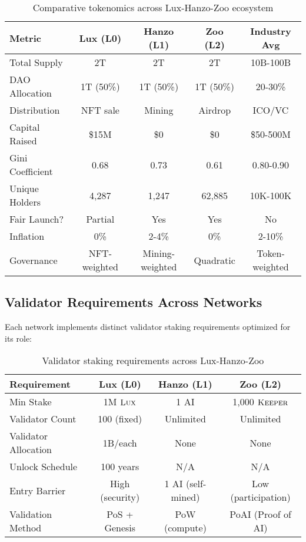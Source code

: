 \documentclass[11pt,letterpaper]{article}
\theoremstyle{definition}
\theoremstyle{remark}
\newcommand{\KEEPER}{\textsc{Keeper}}
\newcommand{\Lux}{\textsc{Lux}}
\begin{document}
\begin{table}[h]
\centering
\small
\begin{tabular}{lcccc}
\toprule
\textbf{Metric} & \textbf{Lux (L0)} & \textbf{Hanzo (L1)} & \textbf{Zoo (L2)} & \textbf{Industry Avg} \\
\midrule
Total Supply & 2T & 2T & 2T & 10B-100B \\
DAO Allocation & 1T (50\%) & 1T (50\%) & 1T (50\%) & 20-30\% \\
Distribution & NFT sale & Mining & Airdrop & ICO/VC \\
Capital Raised & \$15M & \$0 & \$0 & \$50-500M \\
Gini Coefficient & 0.68 & 0.73 & 0.61 & 0.80-0.90 \\
Unique Holders & 4,287 & 1,247 & 62,885 & 10K-100K \\
Fair Launch? & Partial & Yes & Yes & No \\
Inflation & 0\% & 2-4\% & 0\% & 2-10\% \\
Governance & NFT-weighted & Mining-weighted & Quadratic & Token-weighted \\
\bottomrule
\end{tabular}
\caption{Comparative tokenomics across Lux-Hanzo-Zoo ecosystem}
\label{tab:cross_network}
\end{table}

\subsection{Validator Requirements Across Networks}

Each network implements distinct validator staking requirements optimized for its role:

\begin{table}[h]
\centering
\begin{tabular}{lccc}
\toprule
\textbf{Requirement} & \textbf{Lux (L0)} & \textbf{Hanzo (L1)} & \textbf{Zoo (L2)} \\
\midrule
Min Stake & 1M $\Lux$ & 1 AI & 1,000 $\KEEPER$ \\
Validator Count & 100 (fixed) & Unlimited & Unlimited \\
Validator Allocation & 1B/each & None & None \\
Unlock Schedule & 100 years & N/A & N/A \\
Entry Barrier & High (security) & 1 AI (self-mined) & Low (participation) \\
Validation Method & PoS + Genesis & PoW (compute) & PoAI (Proof of AI) \\
\bottomrule
\end{tabular}
\caption{Validator staking requirements across Lux-Hanzo-Zoo}
\label{tab:validator_comparison}
\end{table}
\end{document}
